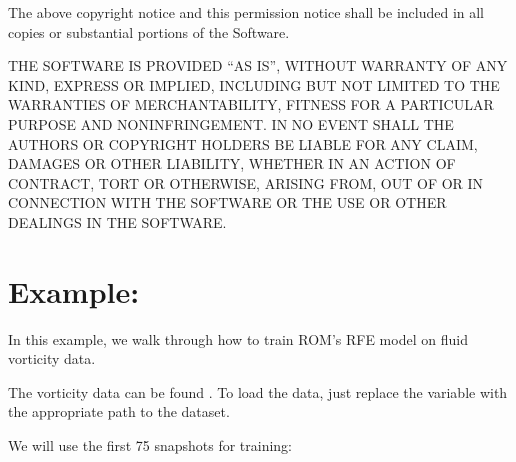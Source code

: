 \documentclass[letterpaper,10pt,english]{sphinxmanual}
\begin{document}
\sphinxAtStartPar
The above copyright notice and this permission notice shall be included in all
copies or substantial portions of the Software.

\sphinxAtStartPar
THE SOFTWARE IS PROVIDED “AS IS”, WITHOUT WARRANTY OF ANY KIND, EXPRESS OR
IMPLIED, INCLUDING BUT NOT LIMITED TO THE WARRANTIES OF MERCHANTABILITY,
FITNESS FOR A PARTICULAR PURPOSE AND NONINFRINGEMENT. IN NO EVENT SHALL THE
AUTHORS OR COPYRIGHT HOLDERS BE LIABLE FOR ANY CLAIM, DAMAGES OR OTHER
LIABILITY, WHETHER IN AN ACTION OF CONTRACT, TORT OR OTHERWISE, ARISING FROM,
OUT OF OR IN CONNECTION WITH THE SOFTWARE OR THE USE OR OTHER DEALINGS IN THE
SOFTWARE.


\chapter{Example:}
\label{\detokenize{index:example}}
\sphinxAtStartPar
In this example, we walk through how to train ROM’s RFE model on fluid vorticity data.

\begin{sphinxVerbatim}[commandchars=\\\{\}]
   
 
   
\end{sphinxVerbatim}

\sphinxAtStartPar
The vorticity data can be found .
To load the data, just replace the  variable with the appropriate path to the dataset.

\begin{sphinxVerbatim}[commandchars=\\\{\}]
  
  
  \PYG{p}{[}\PYG{p}{]}
  \PYG{p}{[}\PYG{p}{]}
\end{sphinxVerbatim}

\sphinxAtStartPar
We will use the first 75 snapshots for training:

\begin{sphinxVerbatim}[commandchars=\\\{\}]
   
  \PYG{p}{[}\PYG{p}{]}
  \PYG{p}{[}\PYG{p}{]}
\end{sphinxVerbatim}
\end{document}
